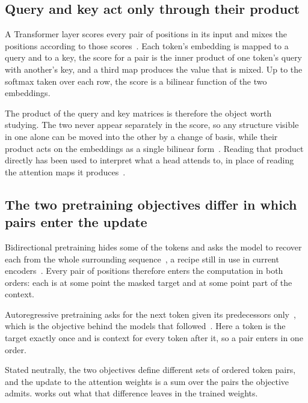 \subsection{Query and key act only through their product}
\label{sec:bg_qk}

A Transformer layer scores every pair of positions in its input and mixes the
positions according to those scores~\cite{vaswani_attention_2017}. Each token's
embedding is mapped to a query and to a key, the score for a pair is the inner
product of one token's query with another's key, and a third map produces the
value that is mixed. Up to the softmax taken over each row, the score is a
bilinear function of the two embeddings.

The product of the query and key matrices is therefore the object worth
studying. The two never appear separately in the
score, so any structure visible in one alone can be moved into the other by a
change of basis, while their product acts on the embeddings as a single
bilinear form~\cite{elhage_mathematical_2021}. Reading that product directly
has been used to interpret what a head attends to, in place of reading the
attention maps it produces~\cite{dar_analyzing_2023}.

\subsection{The two pretraining objectives differ in which pairs enter the update}
\label{sec:bg_objectives}

Bidirectional pretraining hides some of the tokens and asks the model to
recover each from the whole surrounding sequence~\cite{devlin_bert_2019}, a
recipe still in use in current
encoders~\cite{warner_smarter_2024}. Every pair of positions therefore enters
the computation in both orders: each is at some point the masked target and at
some point part of the context.

Autoregressive pretraining asks for the next token given its predecessors
only~\cite{radford_improving_2018}, which is the objective behind the models
that followed~\cite{brown_language_2020, touvron_llama_2023a}. Here a token is
the target exactly once and is context for every token after it, so a pair
enters in one order.

Stated neutrally, the two objectives define different sets of ordered token
pairs, and the update to the attention weights is a sum over the pairs the
objective admits.  works out what that difference leaves
in the trained weights.


